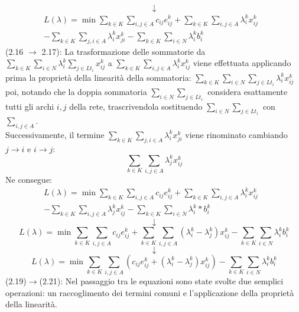 \documentclass[12pt,a4paper,twoside]{report}
\begin{document}
	$$\downarrow$$
	\begin{equation}
		\begin{split}
			L(\lambda)= \min \sum_{k \in K}\sum_{i,j \in A} c_{ij}e^k_{ij} +\sum_{k \in K}\sum_{i,j \in A} \lambda^k_i x^k_{ij} & \\  -\sum_{k \in K}\sum_{j,i \in A} \lambda^k_i x^k_{ji}- \sum_{k \in K}\sum_{i \in N}\lambda^k_ib^k_i
		\end{split}
	\end{equation}
	(2.16 $\rightarrow$ 2.17): La trasformazione delle sommatorie da $\sum_{k \in K}\sum_{i \in N} \lambda^k_i \sum_{j \in Lt_i}x^k_{ij}$ a $\sum_{k \in K}\sum_{i,j \in A} \lambda^k_i x^k_{ij}$ viene effettuata applicando prima la proprietà della linearità della sommatoria: $\sum_{k \in K}\sum_{i \in N}\sum_{j \in Lt_i} \lambda^k_i x^k_{ij}$ poi, notando che la doppia sommatoria $\sum_{i \in N}\sum_{j \in Lt_i}$ considera esattamente tutti gli archi $i,j$ della rete, trascrivendola sostituendo $\sum_{i \in N}\sum_{j \in Lt_i}$ con $\sum_{i,j \in A}$. \smallskip \\
	Successivamente, il termine $\sum_{k \in K}\sum_{j,i \in A} \lambda^k_i x^k_{ji}$ viene rinominato cambiando $j \rightarrow i$ e $i \rightarrow j$:
	\begin{equation}
		\sum_{k \in K}\sum_{i,j \in A} \lambda^k_j x^k_{ij}
	\end{equation}
	Ne consegue:
	\begin{equation}
		\begin{split}
			L(\lambda)= \min \sum_{k \in K}\sum_{i,j \in A} c_{ij}e^k_{ij}+\sum_{k \in K}\sum_{i,j \in A} \lambda^k_i x^k_{ij} & \\-\sum_{k \in K}\sum_{i,j \in A} \lambda^k_j x^k_{ij}- \sum_{k \in K}\sum_{i \in N}\lambda^k_i*b^k_i
		\end{split}
	\end{equation}
	$$\downarrow$$
	\begin{equation}
		L(\lambda)= \min \sum_{k \in K}\sum_{i,j \in A} c_{ij}e^k_{ij}+\sum_{k \in K}\sum_{i,j \in A} (\lambda^k_i - \lambda^k_j)x^k_{ij}-\sum_{k \in K}\sum_{i \in N} \lambda^k_i b^k_i
	\end{equation}
	$$\downarrow$$
	\begin{equation}
		L(\lambda)= \min \sum_{k \in K}\sum_{i,j \in A} (c_{ij}e^k_{ij}+(\lambda^k_i-\lambda^k_j)x^k_{ij})-\sum_{k \in K}\sum_{i \in N}\lambda^k_ib^k_i
	\end{equation}
	(2.19)$\rightarrow$(2.21): Nel passaggio tra le equazioni sono state svolte due semplici operazioni: un raccoglimento dei termini comuni e l'applicazione della proprietà della linearità. \smallskip \\
\end{document}
